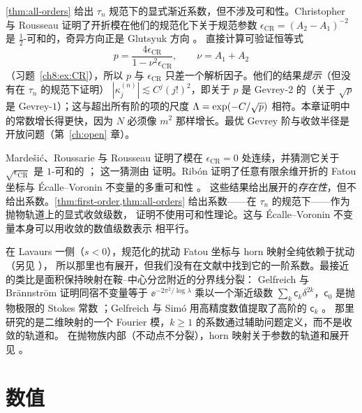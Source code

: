 \begin{remark}\label{ch8:rem:gevrey}
\cref{thm:all-orders} 给出 $\tau_n$ 规范下的显式渐近系数，但不涉及可和性。Christopher 与 Rousseau 证明了开折模在他们的规范化下关于规范参数
$\epsilon_{\mathrm{CR}}=(A_2-A_1)^{-2}$ 是 $\frac12$-可和的，奇异方向正是 Glutsyuk 方向 \cite[Cor.~4.9]{ChristopherRousseau}。
直接计算可验证恒等式
\[
 p=\frac{4\epsilon_{\mathrm{CR}}}{1-\nu^2\epsilon_{\mathrm{CR}}},\qquad \nu=A_1+A_2
\]
（习题~\ref{ch8:ex:CR}），所以 $p$ 与 $\epsilon_{\mathrm{CR}}$ 只差一个解析因子。他们的结果\emph{提示}（但没有在 $\tau_n$ 的规范下证明）
$|\kappa^{(n)}_j|\lesssim C^j(j!)^2$，即关于 $p$ 是 Gevrey-$2$ 的（关于 $\sqrt p$ 是 Gevrey-$1$）；这与超出所有阶的项的尺度
$\Lambda=\exp(-C/\sqrt p)$ 相符。本章证明中的常数增长得更快，因为 $N$ 必须像 $m^2$ 那样增长。最优 Gevrey 阶与收敛半径是开放问题（第~\ref{ch:open} 章）。
\end{remark}

\begin{remark}[与文献的关系]\label{ch8:rem:literature}
Mardešić、Roussarie 与 Rousseau 证明了模在 $\epsilon_{\mathrm{CR}}=0$ 处连续，并猜测它关于 $\sqrt{\epsilon_{\mathrm{CR}}}$ 是 $1$-可和的 \cite[§11]{MRR2004}；
这一猜测由 \cite{ChristopherRousseau} 证明。Ribón 证明了任意有限余维开折的 Fatou 坐标与 Écalle--Voronin 不变量的多重可和性 \cite{Ribon2010}。
这些结果给出展开的\emph{存在性}，但不给出系数。\cref{thm:first-order,thm:all-orders} 给出系数——在 $\tau_n$ 的规范下——作为抛物轨道上的显式收敛级数，
证明不使用可和性理论。这与 Écalle--Voronin 不变量本身可以用收敛的数值级数表示 \cite{DudkoSauzin2014} 相平行。

在 Lavaurs 一侧（$s<0$），规范化的扰动 Fatou 坐标与 horn 映射全纯依赖于扰动 \cite{Shishikura2000}（另见 \cite[Thms.~1.3, 2.1]{InouShishikura}），
所以那里也有展开，但我们没有在文献中找到它的一阶系数。最接近的类比是面积保持映射在鞍--中心分岔附近的分界线分裂：
Gelfreich 与 Brännström 证明同宿不变量等于 $\ee^{-2\pi^2/\log\lambda}$ 乘以一个渐近级数 $\sum_k\mathsf c_k\delta^{2k}$，$\mathsf c_0$ 是抛物极限的 Stokes 常数
\cite{GelfreichBrannstrom,GelfreichSauzin2001}；Gelfreich 与 Simó 用高精度数值提取了高阶的 $\mathsf c_k$ \cite{GelfreichSimo2008}。
那里研究的是二维映射的一个 Fourier 模，$k\ge1$ 的系数通过辅助问题定义，而不是收敛的轨道和。
在抛物族内部（不动点不分裂），horn 映射关于参数的轨道和展开见 \cite[Prop.~9.1]{BuffEcalleEpstein2013}。
\end{remark}

\section{数值}\label{ch8:sec:numerics}

